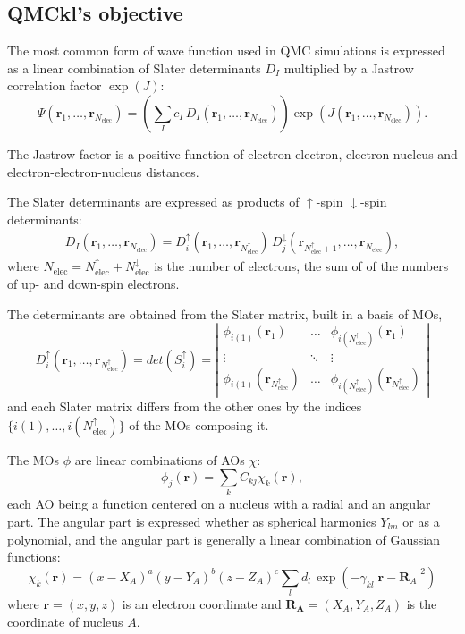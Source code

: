 \subsection{QMCkl's objective}

\newcommand{\Nelec}{N_{\text{elec}}}
\newcommand{\Nelecup}{N_{\text{elec}}^\uparrow}
\newcommand{\Nelecdn}{N_{\text{elec}}^\downarrow}
\newcommand{\br}{\mathbf{r}_1,\dots,\mathbf{r}_{\Nelec}}
\newcommand{\brup}{\mathbf{r}_1,\dots,\mathbf{r}_{\Nelec^\uparrow}}
\newcommand{\brdn}{\mathbf{r}_{\Nelec^\uparrow+1},\dots,\mathbf{r}_{\Nelec}}

The most common form of wave function used in \ac{QMC} simulations is
expressed as a linear combination of Slater determinants $D_I$ multiplied by
a Jastrow correlation factor $\exp(J)$:
\begin{equation}
  \Psi(\br) = \left( \sum_I c_I\, D_I(\br) \right) \exp \left( J(\br) \right).
\end{equation}

The Jastrow factor is a positive function of electron-electron,
electron-nucleus and electron-electron-nucleus distances. 

The Slater determinants are expressed as products of $\uparrow$-spin
$\downarrow$-spin determinants:
\begin{eqnarray}
D_I(\br) = D_i^\uparrow(\brup)\, D_j^\downarrow(\brdn),
\end{eqnarray}
where $\Nelec = \Nelecup + \Nelecdn$ is the number of
electrons, the sum of of the numbers of up- and down-spin electrons.

The determinants are obtained from the Slater matrix, built in a basis of \acp{MO},
\begin{equation}
  D_i^\uparrow(\brup) = det(S_i^\uparrow) = \left|
    \begin{array}{ccc}
      \phi_{i(1)}(\mathbf{r}_1) & \dots & \phi_{i(\Nelecup)}(\mathbf{r}_1) \\
        \vdots & \ddots & \vdots \\
      \phi_{i(1)}(\mathbf{r}_{\Nelecup}) & \dots & \phi_{i(\Nelecup)}(\mathbf{r}_{\Nelecup}) 
    \end{array}
    \right|
\end{equation}
and each Slater matrix differs from the other ones by the indices $\{
i(1), \dots, i(\Nelecup) \}$ of the \acp{MO} composing it.

The \acp{MO} $\phi$ are linear combinations of \acp{AO} $\chi$:
\begin{equation}
\phi_j(\mathbf{r}) = \sum_k C_{kj} \chi_k(\mathbf{r}),
\end{equation}
each \ac{AO} being a function centered on a nucleus with a radial and an angular part.
The angular part is expressed whether as spherical harmonics $Y_{lm}$ or as a polynomial, and
the angular part is generally a linear combination of Gaussian functions:
\begin{equation}
\chi_k(\mathbf{r}) = (x-X_A)^a (y-Y_A)^b (z-Z_A)^c \sum_l d_l\, \exp \left(
    -\gamma_{kl} |\mathbf{r}-\mathbf{R}_A|^2 \right)
\end{equation}
where $\mathbf{r} = (x,y,z)$ is an electron coordinate and 
$\mathbf{R_A} = (X_A,Y_A,Z_A)$ is the coordinate of nucleus $A$.

